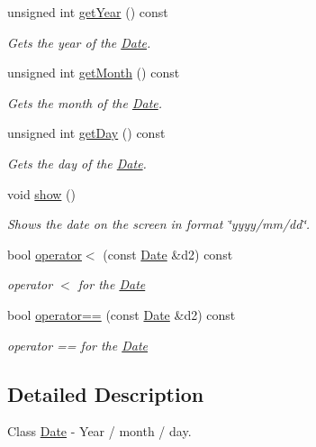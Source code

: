 \begin{DoxyCompactItemize}
unsigned int \hyperlink{class_date_a597b505c264a24d34369c43119fc4e6e}{get\+Year} () const
\begin{DoxyCompactList}\small\item\em Gets the year of the \hyperlink{class_date}{Date}. \end{DoxyCompactList}\item 
unsigned int \hyperlink{class_date_a6152596dcf2e1e78e2095ea518de59e7}{get\+Month} () const
\begin{DoxyCompactList}\small\item\em Gets the month of the \hyperlink{class_date}{Date}. \end{DoxyCompactList}\item 
unsigned int \hyperlink{class_date_a13855b25efb79eaf7dccf08555421a1d}{get\+Day} () const
\begin{DoxyCompactList}\small\item\em Gets the day of the \hyperlink{class_date}{Date}. \end{DoxyCompactList}\item 
void \hyperlink{class_date_addaed921af229dffeb35ef7ef30bff29}{show} ()
\begin{DoxyCompactList}\small\item\em Shows the date on the screen in format \char`\"{}yyyy/mm/dd\char`\"{}. \end{DoxyCompactList}\item 
bool \hyperlink{class_date_a09704874041e417655bf7be43596da80}{operator$<$} (const \hyperlink{class_date}{Date} \&d2) const
\begin{DoxyCompactList}\small\item\em operator $<$ for the \hyperlink{class_date}{Date} \end{DoxyCompactList}\item 
bool \hyperlink{class_date_ab33fabb71e001e3bb98aa3aff846ea65}{operator==} (const \hyperlink{class_date}{Date} \&d2) const
\begin{DoxyCompactList}\small\item\em operator == for the \hyperlink{class_date}{Date} \end{DoxyCompactList}\end{DoxyCompactItemize}


\subsection{Detailed Description}
Class \hyperlink{class_date}{Date} -\/ Year / month / day. 

